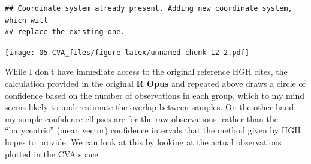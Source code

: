\documentclass[
]{book}
\newenvironment{Shaded}{\begin{snugshade}}{\end{snugshade}}
\newcommand{\AttributeTok}[1]{\textcolor[rgb]{0.13,0.29,0.53}{#1}}
\newcommand{\CommentTok}[1]{\textcolor[rgb]{0.56,0.35,0.01}{\textit{#1}}}
\newcommand{\DecValTok}[1]{\textcolor[rgb]{0.00,0.00,0.81}{#1}}
\newcommand{\FunctionTok}[1]{\textcolor[rgb]{0.13,0.29,0.53}{\textbf{#1}}}
\newcommand{\NormalTok}[1]{#1}
\newcommand{\SpecialCharTok}[1]{\textcolor[rgb]{0.81,0.36,0.00}{\textbf{#1}}}
\newcommand{\StringTok}[1]{\textcolor[rgb]{0.31,0.60,0.02}{#1}}
\begin{document}
\begin{Shaded}
\end{Shaded}

\begin{verbatim}
## Coordinate system already present. Adding new coordinate system, which will
## replace the existing one.
\end{verbatim}

\texttt{[image: 05-CVA\_files/figure-latex/unnamed-chunk-12-2.pdf]}

While I don't have immediate access to the original reference HGH cites, the calculation provided in the original \textbf{R Opus} and repeated above draws a circle of confidence based on the number of observations in each group, which to my mind seems likely to underestimate the overlap between samples. On the other hand, my simple confidence ellipses are for the raw observations, rather than the ``barycentric'' (mean vector) confidence intervals that the method given by HGH hopes to provide. We can look at this by looking at the actual observations plotted in the CVA space.
\end{document}

